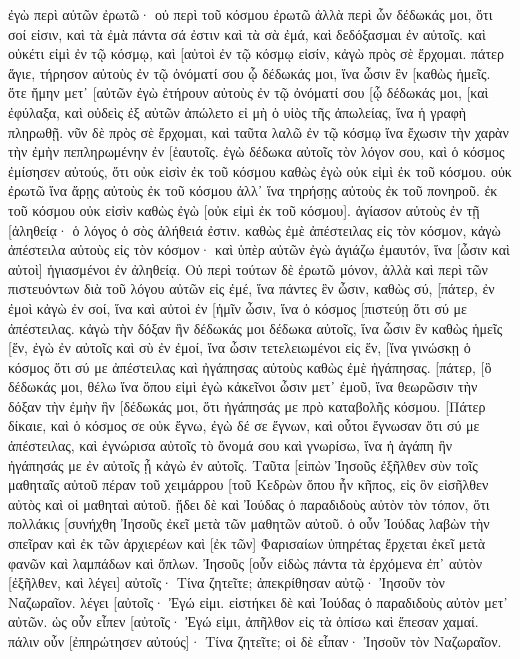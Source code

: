 ἐγὼ περὶ αὐτῶν ἐρωτῶ· οὐ περὶ τοῦ κόσμου ἐρωτῶ ἀλλὰ περὶ ὧν δέδωκάς μοι, ὅτι σοί εἰσιν, 
καὶ τὰ ἐμὰ πάντα σά ἐστιν καὶ τὰ σὰ ἐμά, καὶ δεδόξασμαι ἐν αὐτοῖς. 
καὶ οὐκέτι εἰμὶ ἐν τῷ κόσμῳ, καὶ [αὐτοὶ ἐν τῷ κόσμῳ εἰσίν, κἀγὼ πρὸς σὲ ἔρχομαι. πάτερ ἅγιε, τήρησον αὐτοὺς ἐν τῷ ὀνόματί σου ᾧ δέδωκάς μοι, ἵνα ὦσιν ἓν [καθὼς ἡμεῖς. 
ὅτε ἤμην μετ᾽ [αὐτῶν ἐγὼ ἐτήρουν αὐτοὺς ἐν τῷ ὀνόματί σου [ᾧ δέδωκάς μοι, [καὶ ἐφύλαξα, καὶ οὐδεὶς ἐξ αὐτῶν ἀπώλετο εἰ μὴ ὁ υἱὸς τῆς ἀπωλείας, ἵνα ἡ γραφὴ πληρωθῇ. 
νῦν δὲ πρὸς σὲ ἔρχομαι, καὶ ταῦτα λαλῶ ἐν τῷ κόσμῳ ἵνα ἔχωσιν τὴν χαρὰν τὴν ἐμὴν πεπληρωμένην ἐν [ἑαυτοῖς. 
ἐγὼ δέδωκα αὐτοῖς τὸν λόγον σου, καὶ ὁ κόσμος ἐμίσησεν αὐτούς, ὅτι οὐκ εἰσὶν ἐκ τοῦ κόσμου καθὼς ἐγὼ οὐκ εἰμὶ ἐκ τοῦ κόσμου. 
οὐκ ἐρωτῶ ἵνα ἄρῃς αὐτοὺς ἐκ τοῦ κόσμου ἀλλ᾽ ἵνα τηρήσῃς αὐτοὺς ἐκ τοῦ πονηροῦ. 
ἐκ τοῦ κόσμου οὐκ εἰσὶν καθὼς ἐγὼ [οὐκ εἰμὶ ἐκ τοῦ κόσμου]. 
ἁγίασον αὐτοὺς ἐν τῇ [ἀληθείᾳ· ὁ λόγος ὁ σὸς ἀλήθειά ἐστιν. 
καθὼς ἐμὲ ἀπέστειλας εἰς τὸν κόσμον, κἀγὼ ἀπέστειλα αὐτοὺς εἰς τὸν κόσμον· 
καὶ ὑπὲρ αὐτῶν ἐγὼ ἁγιάζω ἐμαυτόν, ἵνα [ὦσιν καὶ αὐτοὶ] ἡγιασμένοι ἐν ἀληθείᾳ. 
Οὐ περὶ τούτων δὲ ἐρωτῶ μόνον, ἀλλὰ καὶ περὶ τῶν πιστευόντων διὰ τοῦ λόγου αὐτῶν εἰς ἐμέ, 
ἵνα πάντες ἓν ὦσιν, καθὼς σύ, [πάτερ, ἐν ἐμοὶ κἀγὼ ἐν σοί, ἵνα καὶ αὐτοὶ ἐν [ἡμῖν ὦσιν, ἵνα ὁ κόσμος [πιστεύῃ ὅτι σύ με ἀπέστειλας. 
κἀγὼ τὴν δόξαν ἣν δέδωκάς μοι δέδωκα αὐτοῖς, ἵνα ὦσιν ἓν καθὼς ἡμεῖς [ἕν, 
ἐγὼ ἐν αὐτοῖς καὶ σὺ ἐν ἐμοί, ἵνα ὦσιν τετελειωμένοι εἰς ἕν, [ἵνα γινώσκῃ ὁ κόσμος ὅτι σύ με ἀπέστειλας καὶ ἠγάπησας αὐτοὺς καθὼς ἐμὲ ἠγάπησας. 
[πάτερ, [ὃ δέδωκάς μοι, θέλω ἵνα ὅπου εἰμὶ ἐγὼ κἀκεῖνοι ὦσιν μετ᾽ ἐμοῦ, ἵνα θεωρῶσιν τὴν δόξαν τὴν ἐμὴν ἣν [δέδωκάς μοι, ὅτι ἠγάπησάς με πρὸ καταβολῆς κόσμου. 
[Πάτερ δίκαιε, καὶ ὁ κόσμος σε οὐκ ἔγνω, ἐγὼ δέ σε ἔγνων, καὶ οὗτοι ἔγνωσαν ὅτι σύ με ἀπέστειλας, 
καὶ ἐγνώρισα αὐτοῖς τὸ ὄνομά σου καὶ γνωρίσω, ἵνα ἡ ἀγάπη ἣν ἠγάπησάς με ἐν αὐτοῖς ᾖ κἀγὼ ἐν αὐτοῖς. 
Ταῦτα [εἰπὼν Ἰησοῦς ἐξῆλθεν σὺν τοῖς μαθηταῖς αὐτοῦ πέραν τοῦ χειμάρρου [τοῦ Κεδρὼν ὅπου ἦν κῆπος, εἰς ὃν εἰσῆλθεν αὐτὸς καὶ οἱ μαθηταὶ αὐτοῦ. 
ᾔδει δὲ καὶ Ἰούδας ὁ παραδιδοὺς αὐτὸν τὸν τόπον, ὅτι πολλάκις [συνήχθη Ἰησοῦς ἐκεῖ μετὰ τῶν μαθητῶν αὐτοῦ. 
ὁ οὖν Ἰούδας λαβὼν τὴν σπεῖραν καὶ ἐκ τῶν ἀρχιερέων καὶ [ἐκ τῶν] Φαρισαίων ὑπηρέτας ἔρχεται ἐκεῖ μετὰ φανῶν καὶ λαμπάδων καὶ ὅπλων. 
Ἰησοῦς [οὖν εἰδὼς πάντα τὰ ἐρχόμενα ἐπ᾽ αὐτὸν [ἐξῆλθεν, καὶ λέγει] αὐτοῖς· Τίνα ζητεῖτε; 
ἀπεκρίθησαν αὐτῷ· Ἰησοῦν τὸν Ναζωραῖον. λέγει [αὐτοῖς· Ἐγώ εἰμι. εἱστήκει δὲ καὶ Ἰούδας ὁ παραδιδοὺς αὐτὸν μετ᾽ αὐτῶν. 
ὡς οὖν εἶπεν [αὐτοῖς· Ἐγώ εἰμι, ἀπῆλθον εἰς τὰ ὀπίσω καὶ ἔπεσαν χαμαί. 
πάλιν οὖν [ἐπηρώτησεν αὐτούς]· Τίνα ζητεῖτε; οἱ δὲ εἶπαν· Ἰησοῦν τὸν Ναζωραῖον. 
